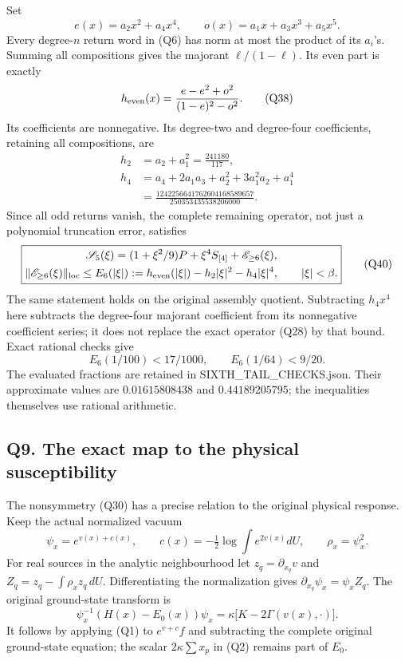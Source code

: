 \documentclass[11pt]{article}
\begin{document}
Set
\[
 e(x)=a_2x^2+a_4x^4,\qquad
 o(x)=a_1x+a_3x^3+a_5x^5.
\]
Every degree-\(n\) return word in (Q6) has norm at most the product of its \(a_i\)'s. Summing all compositions gives the majorant \(\ell/(1-\ell)\). Its even part is exactly
\[
 h_{\rm even}(x)=\frac{e-e^2+o^2}{(1-e)^2-o^2}.
 \tag{Q38}
\]
Its coefficients are nonnegative. Its degree-two and degree-four coefficients, retaining all compositions, are
\[
 \begin{aligned}
 h_2&=a_2+a_1^2=\frac{241180}{117},\\
 h_4&=a_4+2a_1a_3+a_2^2+3a_1^2a_2+a_1^4\\
 &=\frac{1242256641762604168589657}{250353435538206000}.
 \end{aligned}\tag{Q39}
\]
Since all odd returns vanish, the complete remaining operator, not just a polynomial truncation error, satisfies
\[
 \boxed{\begin{gathered}
 \mathscr S_5(\xi)=(1+\xi^2/9)P+\xi^4S_{[4]}+\mathscr E_{\ge6}(\xi),\\
 \|\mathscr E_{\ge6}(\xi)\|_{\rm loc}
 \le E_6(|\xi|):=
 h_{\rm even}(|\xi|)-h_2|\xi|^2-h_4|\xi|^4,
 \qquad |\xi|<\beta .
 \end{gathered}}\tag{Q40}
\]
The same statement holds on the original assembly quotient. Subtracting \(h_4x^4\) here subtracts the degree-four majorant coefficient from its nonnegative coefficient series; it does not replace the exact operator (Q28) by that bound. Exact rational checks give
\[
 E_6(1/100)<17/1000,\qquad E_6(1/64)<9/20.
 \tag{Q41}
\]
The evaluated fractions are retained in SIXTH\_TAIL\_CHECKS.json. Their approximate values are \(0.01615808438\) and \(0.44189205795\); the inequalities themselves use rational arithmetic.

\subsection*{Q9. The exact map to the physical susceptibility}

The nonsymmetry (Q30) has a precise relation to the original physical response. Keep the actual normalized vacuum
\[
 \psi_x=e^{v(x)+c(x)},\qquad
 c(x)=-\tfrac12\log\int e^{2v(x)}dU,\qquad \rho_x=\psi_x^2.
 \tag{Q42}
\]
For real sources in the analytic neighbourhood let \(z_q=\partial_{x_q}v\) and \(Z_q=z_q-\int\rho_xz_q\,dU\). Differentiating the normalization gives \(\partial_{x_q}\psi_x=\psi_xZ_q\). The original ground-state transform is
\[
 \psi_x^{-1}(H(x)-E_0(x))\psi_x
 =\kappa\bigl[K-2\Gamma(v(x),\cdot)\bigr].
 \tag{Q43}
\]
It follows by applying (Q1) to \(e^{v+c}f\) and subtracting the complete original ground-state equation; the scalar \(2\kappa\sum x_p\) in (Q2) remains part of \(E_0\).
\end{document}
